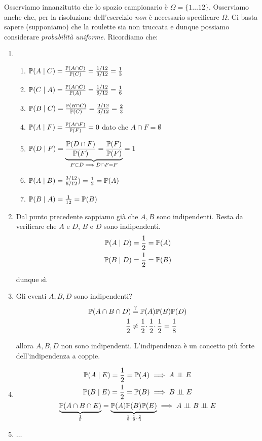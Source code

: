 Osserviamo innanzitutto che lo spazio campionario è $\Omega =\{1\dots 12\}$. Osserviamo anche che, per la risoluzione dell'esercizio \textit{non} è necessario specificare $\Omega $. Ci basta sapere (supponiamo) che la roulette sia non truccata e dunque possiamo considerare \textit{probabilità uniforme}. Ricordiamo che:
\begin{enumerate}
\item 
\begin{enumerate}
\item $\mathbb{P}( A\mid C) =\frac{\mathbb{P}( A\cap C)}{\mathbb{P}( C)} =\frac{1/12}{3/12} =\frac{1}{3}$
\item $\mathbb{P}( C\mid A) =\frac{\mathbb{P}( A\cap C)}{\mathbb{P}( A)} =\frac{1/12}{6/12} =\frac{1}{6}$
\item $\mathbb{P}( B\mid C) =\frac{\mathbb{P}( B\cap C)}{\mathbb{P}( C)} =\frac{2/12}{3/12} =\frac{2}{3}$
\item $\mathbb{P}( A\mid F) =\frac{\mathbb{P}( A\cap F)}{\mathbb{P}( F)} =0$ dato che $A\cap F=\emptyset $
\item $\mathbb{P}( D\mid F) =\underbrace{\frac{\mathbb{P}( D\cap F)}{\mathbb{P}( F)} =\frac{\mathbb{P}( F)}{\mathbb{P}( F)}}_{F\subset D\implies D\cap F=F} =1$
\item $\mathbb{P}( A\mid B) =\frac{3/12}{6/12}) =\frac{1}{2} =\mathbb{P}( A)$
\item $\mathbb{P}( B\mid A) =\frac{1}{12} =\mathbb{P}( B)$
\end{enumerate}
\item Dal punto precedente sappiamo già che $A,B$ sono indipendenti. Resta da verificare che $A$ e $D$, $B$ e $D$ sono indipendenti.\begin{gather*}
\mathbb{P}( A\mid D) =\frac{1}{2} =\mathbb{P}( A)\\
\mathbb{P}( B\mid D) =\frac{1}{2} =\mathbb{P}( B)
\end{gather*}

dunque sì.
\item Gli eventi $A,B,D$ sono indipendenti?\begin{align*}
\mathbb{P}( A\cap B\cap D) & \overset{?}{=} \mathbb{P}( A)\mathbb{P}( B)\mathbb{P}( D)\\
\frac{1}{2} & \neq \frac{1}{2} \cdotp \frac{1}{2} \cdotp \frac{1}{2} =\frac{1}{8}
\end{align*}

allora $A,B,D$ non sono indipendenti. L'indipendenza è un concetto più forte dell'indipendenza a coppie.
\item \begin{gather*}
\PP( A\mid E) =\frac{1}{2} =\PP( A) \implies A\indep E\\
\PP( B\mid E) =\frac{1}{2} =\PP( B) \implies B\indep E\\
\underbrace{\PP( A\cap B\cap E)}_{\frac{1}{6}} =\underbrace{\PP( A)\PP( B)\PP( E)}_{\frac{1}{2} \cdotp \frac{1}{2} \cdotp \frac{2}{3}} \implies A\indep B\indep E
\end{gather*}
\item $\dots $
\end{enumerate}
\Soluzione

